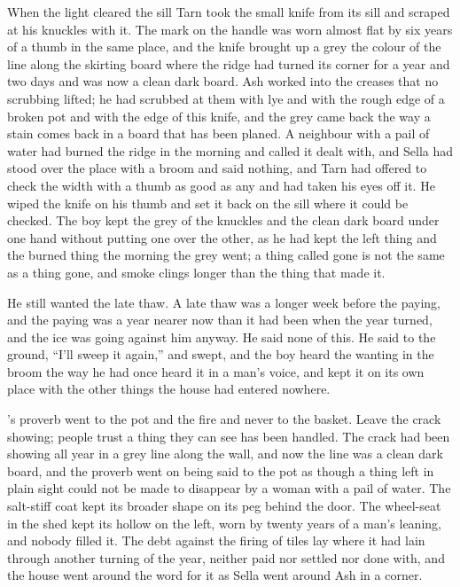 When the light cleared the sill Tarn took the small knife from its sill and scraped at his knuckles with it. The mark on the handle was worn almost flat by six years of a thumb in the same place, and the knife brought up a grey the colour of the line along the skirting board where the ridge had turned its corner for a year and two days and was now a clean dark board. Ash worked into the creases that no scrubbing lifted; he had scrubbed at them with lye and with the rough edge of a broken pot and with the edge of this knife, and the grey came back the way a stain comes back in a board that has been planed. A neighbour with a pail of water had burned the ridge in the morning and called it dealt with, and Sella had stood over the place with a broom and said nothing, and Tarn had offered to check the width with a thumb as good as any and had taken his eyes off it. He wiped the knife on his thumb and set it back on the sill where it could be checked. The boy kept the grey of the knuckles and the clean dark board under one hand without putting one over the other, as he had kept the left thing and the burned thing the morning the grey went; a thing called gone is not the same as a thing gone, and smoke clings longer than the thing that made it.

He still wanted the late thaw. A late thaw was a longer week before the paying, and the paying was a year nearer now than it had been when the year turned, and the ice was going against him anyway. He said none of this. He said to the ground, “I'll sweep it again,” and swept, and the boy heard the wanting in the broom the way he had once heard it in a man's voice, and kept it on its own place with the other things the house had entered nowhere.

's proverb went to the pot and the fire and never to the basket. Leave the crack showing; people trust a thing they can see has been handled. The crack had been showing all year in a grey line along the wall, and now the line was a clean dark board, and the proverb went on being said to the pot as though a thing left in plain sight could not be made to disappear by a woman with a pail of water. The salt-stiff coat kept its broader shape on its peg behind the door. The wheel-seat in the shed kept its hollow on the left, worn by twenty years of a man's leaning, and nobody filled it. The debt against the firing of tiles lay where it had lain through another turning of the year, neither paid nor settled nor done with, and the house went around the word for it as Sella went around Ash in a corner.

